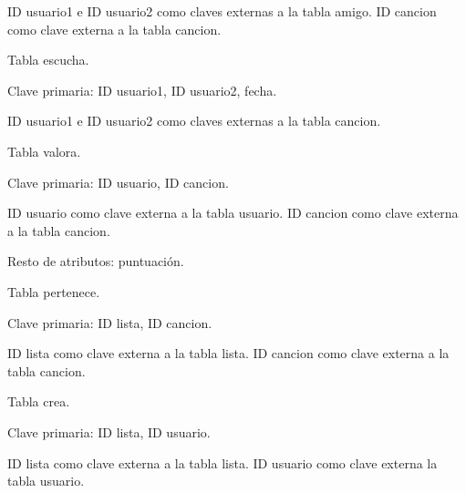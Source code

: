 \documentclass[12pt,a4paper]{article}
\begin{document}
	ID usuario1 e ID usuario2 como claves externas a la tabla amigo.
	ID cancion como clave externa a la tabla cancion.
	
Tabla escucha.
	
	Clave primaria: ID usuario1, ID usuario2, fecha.
	
	ID usuario1 e ID usuario2 como claves externas a la tabla cancion.
	
Tabla valora.

	Clave primaria: ID usuario, ID cancion.
	
	ID usuario como clave externa a la tabla usuario.
	ID cancion como clave externa a la tabla cancion.
	
	Resto de atributos: puntuación.
	
Tabla pertenece.

	Clave primaria: ID lista, ID cancion.
	
	ID lista como clave externa a la tabla lista.
	ID cancion como clave externa a la tabla cancion.
	
Tabla crea.
	
	Clave primaria: ID lista, ID usuario.
	
	ID lista como clave externa a la tabla lista.
	ID usuario como clave externa la tabla usuario.
\end{document}

